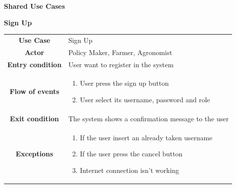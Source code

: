 \documentclass[table, 12pt]{article}
\begin{document}
        \begin{itemize}
            \item \textbf {Shared Use Cases}

            
            \begin{table}[H]
                \item[] \textbf{Sign Up}
                \item[] 
                \centering
                \begin{tabular}{c m{}}
                    \hline
                    \textbf{Use Case} & Sign Up\\ 
                    \textbf{Actor} & Policy Maker, Farmer, Agronomist\\ \hline
                    \textbf{Entry condition} & User want to register in the system\\  \hline
                    \textbf{Flow of events} & \begin{enumerate}
                                                \item User press the sign up button
                                                \item User select its username, password and role
                                            \end{enumerate}\\ \hline
                    \textbf{Exit condition} & The system shows a confirmation message to the user \\ \hline
                    \textbf{Exceptions} &  \begin{enumerate}
                        \item If the user insert an already taken username
                        \item If the user press the cancel button
                        \item Internet connection isn't working
                    \end{enumerate}\\ \hline                    
                \end{tabular}
            \end{table}


\end{itemize}
\end{document}
